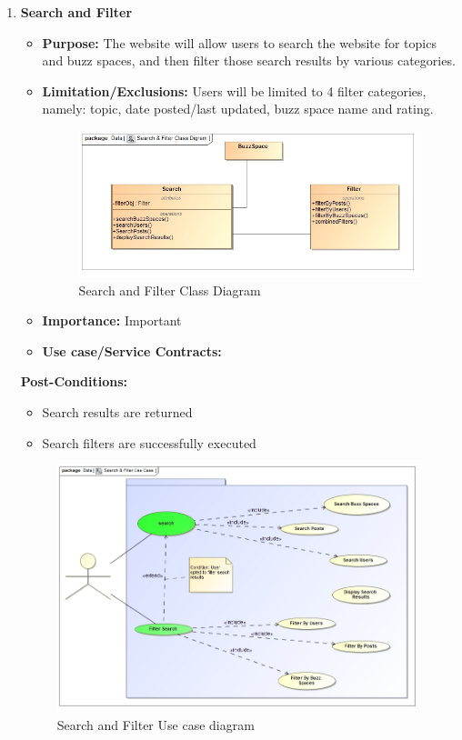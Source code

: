 \documentclass[11pt]{article}
\begin{document}
\begin{enumerate}
\item \textbf{Search and Filter }
\begin{itemize}
\item \textbf{Purpose: }The website will allow users to search the website for topics and buzz spaces, and then filter those search results by various categories. \newline \newline
	\item  \textbf{Limitation/Exclusions: }
Users will be limited to 4 filter categories, namely: topic, date posted/last updated, buzz space name and rating.
 \graphicspath{ {../Diagrams/Sphe/Search&Filter/} }
 \begin{figure}[H]	
    	\includegraphics[scale=0.65]{ClassDiagram.jpg}
    	\caption{Search and Filter Class Diagram}
	\end{figure}
\item \textbf{Importance: } Important

\item \textbf{Use case/Service Contracts: } \newline \newline
\end{itemize}
	  \textbf{Post-Conditions: }
	   
	  \begin{itemize}
	  \item Search results are returned
	  \item	Search filters are successfully executed
	  \end{itemize}
	  \graphicspath{ {../Diagrams/Sphe/Search&Filter/} }
	  \begin{figure}[H]	
    	\includegraphics[scale=0.5]{UseCase.jpg}
    	\caption{Search and Filter Use case diagram}
	\end{figure}
	

\end{enumerate}
\end{document}
